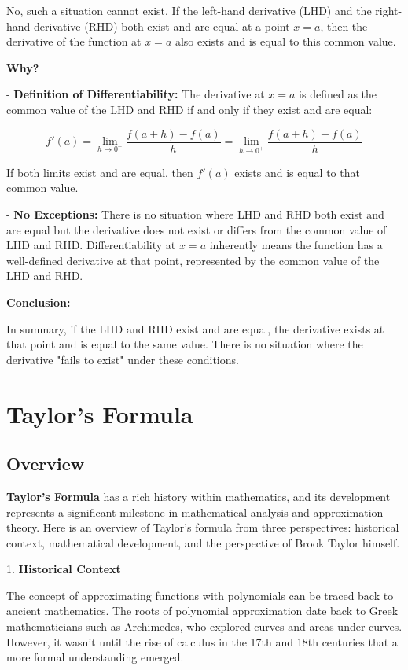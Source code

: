 \documentclass[a4paper,12pt]{book}
\begin{document}
No, such a situation cannot exist. If the left-hand derivative (LHD) and the right-hand derivative (RHD) both exist and are equal at a point \( x = a \), then the derivative of the function at \( x = a \) also exists and is equal to this common value.

\textbf{Why?}

- \textbf{Definition of Differentiability:} The derivative at \( x = a \) is defined as the common value of the LHD and RHD if and only if they exist and are equal:

  \[
  f'(a) = \lim_{h \to 0^-} \dfrac{f(a + h) - f(a)}{h} = \lim_{h \to 0^+} \dfrac{f(a + h) - f(a)}{h}
  \]
  
  If both limits exist and are equal, then \( f'(a) \) exists and is equal to that common value.

- \textbf{No Exceptions:} There is no situation where LHD and RHD both exist and are equal but the derivative does not exist or differs from the common value of LHD and RHD. Differentiability at \( x = a \) inherently means the function has a well-defined derivative at that point, represented by the common value of the LHD and RHD.

\textbf{Conclusion:}

In summary, if the LHD and RHD exist and are equal, the derivative exists at that point and is equal to the same value. There is no situation where the derivative "fails to exist" under these conditions.

\chapter{Taylor's Formula}

\section{Overview}

\textbf{Taylor's Formula} has a rich history within mathematics, and its development represents a significant milestone in mathematical analysis and approximation theory. Here is an overview of Taylor's formula from three perspectives: historical context, mathematical development, and the perspective of Brook Taylor himself.

1. \textbf{Historical Context}

The concept of approximating functions with polynomials can be traced back to ancient mathematics. The roots of polynomial approximation date back to Greek mathematicians such as Archimedes, who explored curves and areas under curves. However, it wasn't until the rise of calculus in the 17th and 18th centuries that a more formal understanding emerged. 
\end{document}
